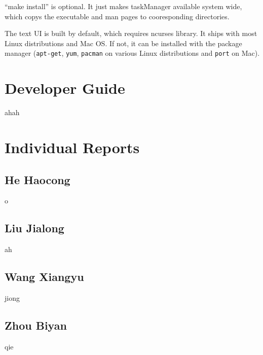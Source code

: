 \documentclass[12pt, a4paper]{article}
\begin{document}
``make install'' is optional. It just makes taskManager available system wide, which copys the executable and man pages to cooresponding directories.

The text UI is built by default, which requires ncurses library.
It ships with most Linux distributions and Mac OS. If not, it can be installed with the package manager (\texttt{apt-get}, \texttt{yum}, \texttt{pacman} on various Linux distributions and \texttt{port} on Mac).

\section{Developer Guide}
ahah

\section{Individual Reports}
\subsection{He Haocong}
o
\subsection{Liu Jialong}
ah
\subsection{Wang Xiangyu}
jiong
\subsection{Zhou Biyan}
qie
\end{document}
